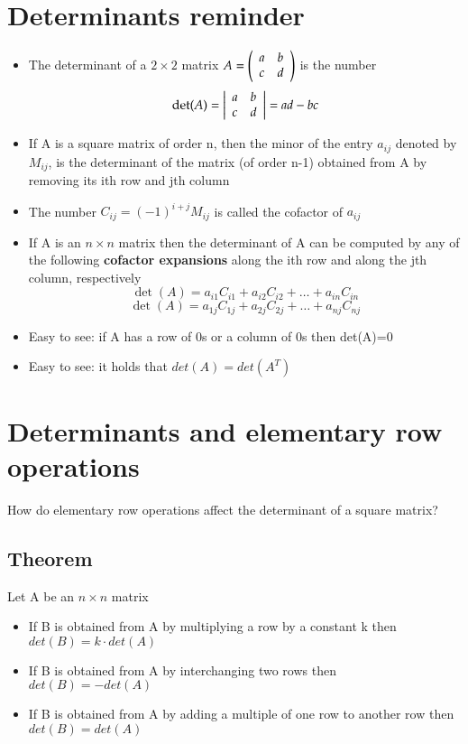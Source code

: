 \documentclass{article}[18pt]
\begin{document}
\section{Determinants reminder}
\begin{itemize}
	\item The determinant of a $2\times 2$ matrix $A = \left( \begin{array} { l l } { a } & { b } \\ { c } & { d } \end{array} \right)$ is the number
	$$\operatorname { det } ( A ) = \left| \begin{array} { l l } { a } & { b } \\ { c } & { d } \end{array} \right| = a d - b c$$
	\item If A is a square matrix of order n, then the minor of the entry $a_{ij}$ denoted by $M_{ij}$, is the determinant of the matrix (of order n-1) obtained from A by removing its ith row and jth column
	\item The number $C _ { i j } = ( - 1 ) ^ { i + j } M _ { i j }$ is called the cofactor of $a_{ij}$
	\item If A is an $n\times n$ matrix then the determinant of A can be computed by any of the following \textbf{cofactor expansions} along the ith row and along the jth column, respectively 
	$$\operatorname { det } ( A ) = a _ { i 1 } C _ { i 1 } + a _ { i 2 } C _ { i 2 } + \ldots + a _ { i n } C _ { i n }$$
	$$\operatorname { det } ( A ) = a _ { 1 j } C _ { 1 j } + a _ { 2 j } C _ { 2 j } + \ldots + a _ { n j } C _ { n j }$$
	\item Easy to see: if A has a row of 0s or a column of 0s then det(A)=0
	\item Easy to see: it holds that $det(A)=det(A^T)$
\end{itemize}
\section{Determinants and elementary row operations}
How do elementary row operations affect the determinant of a square matrix?
\subsection{Theorem}
Let A be an $n\times n$ matrix
\begin{itemize}
	\item If B is obtained from A by multiplying a row by a constant k then $det(B)=k\cdot det(A)$
	\item If B is obtained from A by interchanging two rows then $det(B)=-det(A)$
	\item If B is obtained from A by adding a multiple of one row to another row then $det(B)=det(A)$
\end{itemize}
\end{document}
